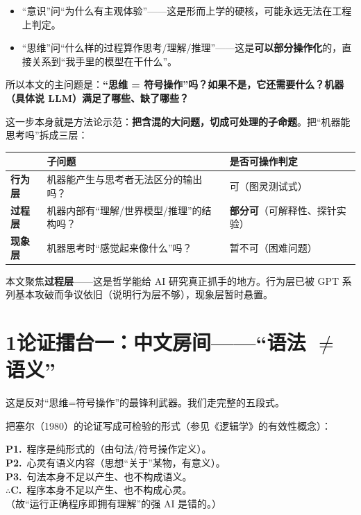 \documentclass[12pt,a4paper,fontset=none]{ctexart}
\newcommand{\stage}[1]{\par\medskip{\large\hei\bfseries\color{ink}#1}\par\nopagebreak\smallskip}
\newcommand{\keyq}[1]{{\hei\bfseries\color{accent}#1}}
\newcommand{\thd}[1]{{\hei\bfseries\color{accent}#1}}
\begin{document}
\begin{itemize}[leftmargin=2.2em,itemsep=0.2em]
\item “意识”问“为什么有主观体验”——这是形而上学的硬核，可能永远无法在工程上判定。
\item “思维”问“什么样的过程算作思考/理解/推理”——这是\textbf{可以部分操作化}的，直接关系到“我手里的模型在干什么”。
\end{itemize}

所以本文的主问题是：\keyq{“思维 = 符号操作”吗？如果不是，它还需要什么？机器（具体说 LLM）满足了哪些、缺了哪些？}

这一步本身就是方法论示范：\textbf{把含混的大问题，切成可处理的子命题}。把“机器能思考吗”拆成三层：

\begin{center}\small
\begin{tabularx}{\linewidth}{>{\raggedright\arraybackslash}p{2.2cm} >{\raggedright\arraybackslash}X >{\raggedright\arraybackslash}p{3.3cm}}
\toprule
\thd{层级} & \thd{子问题} & \thd{是否可操作判定} \\
\midrule
\textbf{行为层} & 机器能产生与思考者无法区分的输出吗？ & 可（图灵测试式） \\
\textbf{过程层} & 机器内部有“理解/世界模型/推理”的结构吗？ & \textbf{部分可}（可解释性、探针实验） \\
\textbf{现象层} & 机器思考时“感觉起来像什么”吗？ & 暂不可（困难问题） \\
\bottomrule
\end{tabularx}
\end{center}

本文聚焦\textbf{过程层}——这是哲学能给 AI 研究真正抓手的地方。行为层已被 GPT 系列基本攻破而争议依旧（说明行为层不够），现象层暂时悬置。

\section*{1\quad 论证擂台一：中文房间——“语法 \(\neq\) 语义”}

这是反对“思维=符号操作”的最锋利武器。我们走完整的五段式。

\stage{① 论证重构}
把塞尔（1980）的论证写成可检验的形式（参见《逻辑学》的有效性概念）：

\begin{argbox}
\textbf{P1.}\, 程序是纯形式的（由句法/符号操作定义）。\\
\textbf{P2.}\, 心灵有语义内容（思想“关于”某物，有意义）。\\
\textbf{P3.}\, 句法本身不足以产生、也不构成语义。\\[0.3em]
\(\therefore\)\;\textbf{C.}\, 程序本身不足以产生、也不构成心灵。\\
\hspace*{1.6em}（故“运行正确程序即拥有理解”的强 AI 是错的。）
\end{argbox}
\end{document}
